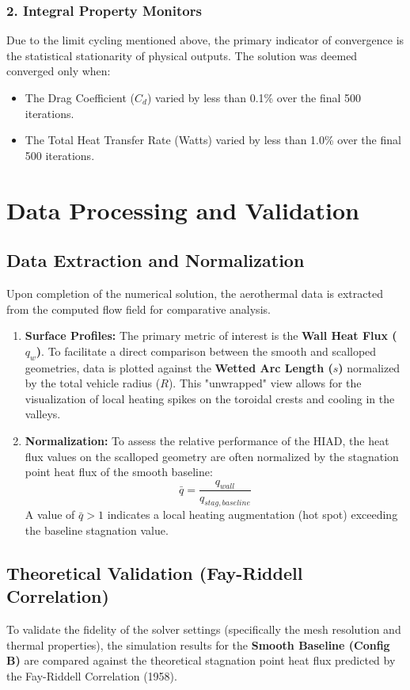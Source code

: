 \subsubsection*{2. Integral Property Monitors}
Due to the limit cycling mentioned above, the primary indicator of convergence is the statistical stationarity of physical outputs. The solution was deemed converged only when:
\begin{itemize}
    \item The Drag Coefficient ($C_d$) varied by less than 0.1\% over the final 500 iterations.
    \item The Total Heat Transfer Rate (Watts) varied by less than 1.0\% over the final 500 iterations.
\end{itemize}

\section{Data Processing and Validation}
\subsection{Data Extraction and Normalization}
Upon completion of the numerical solution, the aerothermal data is extracted from the computed flow field for comparative analysis.

\begin{enumerate}
    \item \textbf{Surface Profiles:} The primary metric of interest is the \textbf{Wall Heat Flux ($q_w$)}. To facilitate a direct comparison between the smooth and scalloped geometries, data is plotted against the \textbf{Wetted Arc Length ($s$)} normalized by the total vehicle radius ($R$). This "unwrapped" view allows for the visualization of local heating spikes on the toroidal crests and cooling in the valleys.
    
    \item \textbf{Normalization:} To assess the relative performance of the HIAD, the heat flux values on the scalloped geometry are often normalized by the stagnation point heat flux of the smooth baseline:
    \begin{equation}
        \bar{q} = \frac{q_{wall}}{q_{stag, baseline}}
    \end{equation}
    A value of $\bar{q} > 1$ indicates a local heating augmentation (hot spot) exceeding the baseline stagnation value.
\end{enumerate}

\subsection{Theoretical Validation (Fay-Riddell Correlation)}
To validate the fidelity of the solver settings (specifically the mesh resolution and thermal properties), the simulation results for the \textbf{Smooth Baseline (Config B)} are compared against the theoretical stagnation point heat flux predicted by the Fay-Riddell Correlation (1958).

